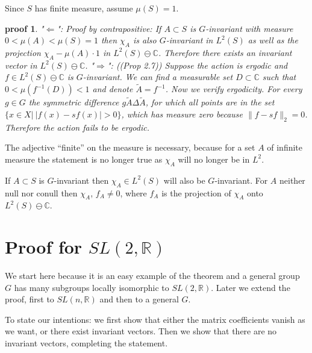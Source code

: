 \documentclass[
]{article}
\newtheorem{pf}{proof}
\begin{document}
Since \(S\) has finite measure, assume \(\mu(S) =1\).

\begin{pf}
"$\Leftarrow$": Proof by contrapositive: If $A\subset S$ is $G$-invariant with measure $0 < \mu(A) < \mu(S) = 1$ then $\chi_A$ is also $G$-invariant in $L^2(S)$ as well as the projection $\chi_A - \mu(A)\cdot 1$ in $L^2(S)\ominus \mathbb{C}$.
Therefore there exists an invariant vector in $L^2(S)\ominus \mathbb{C}$.
"$\Rightarrow$": (\cite{Kerr16}(Prop 2.7)) Suppose the action is ergodic and $f\in L^2(S)\ominus \mathbb{C}$ is $G$-invariant.
We can find a measurable set $D\subset \mathbb{C}$ such that $0<\mu(f^{-1}(D)) < 1$ and denote $\widetilde{A} = f^{-1}$. Now we verify ergodicity. For every $g\in G$ the symmetric difference $g\widetilde{A} \Delta \widetilde{A}$, for which all points are in the set $\{x \in X | \ |f(x)-sf(x)| > 0\}$, which has measure zero because $\|f- sf\|_2=0$. Therefore the action fails to be ergodic.
\end{pf}

The adjective ``finite'' on the measure is necessary, because for a set
\(A\) of infinite measure the statement is no longer true as \(\chi_A\)
will no longer be in \(L^2\).

If \(A\subset S\) is \(G\)-invariant then \(\chi_A\in L^2(S)\) will also
be \(G\)-invariant. 
For \(A\) neither null nor conull then
\(\chi_A\), \(f_A \neq 0\), where \(f_A\) is the projection of
\(\chi_A\) onto \(L^2(S) \ominus \mathbb{C}\).



\hypertarget{proof-for-sln2r}{%
\section{Proof for \(SL(2, \mathbb{R})\)}
\label{proof-for-sln2r}}


We start here because it is an easy example of the theorem and a general
group \(G\) has many subgroups locally isomorphic to
\(SL(2, \mathbb{R})\). Later we extend the proof, first to
\(SL(n, \mathbb{R})\) and then to a general \(G\).

To state our intentions: we first show that either the matrix
coefficients vanish as we want, or there exist invariant vectors. Then
we show that there are no invariant vectors, completing the statement.
\end{document}
